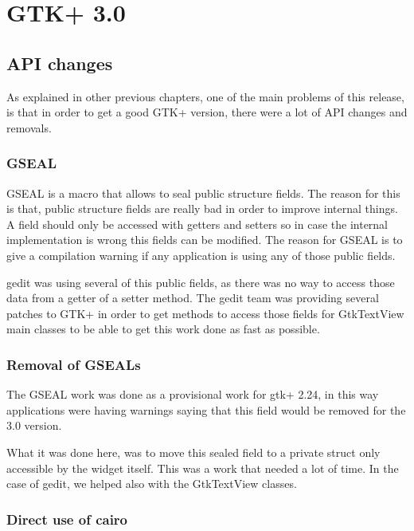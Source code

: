 
\chapter{GTK+ 3.0}


\section{API changes}

As explained in other previous chapters, one of the main problems of this release, is that in order to get a good GTK+ version, there were a lot of API changes and removals.

\subsection{GSEAL}

GSEAL is a macro that allows to seal public structure fields. The reason for this is that, public structure fields are really bad in order to improve internal things. A field should only be accessed with getters and setters so in case the internal implementation is wrong this fields can be modified. The reason for GSEAL is to give a compilation warning if any application is using any of those public fields.

gedit was using several of this public fields, as there was no way to access those data from a getter of a setter method. The gedit team was providing several patches to GTK+ in order to get methods to access those fields for GtkTextView main classes to be able to get this work done as fast as possible.

\subsection{Removal of GSEALs}

The GSEAL work was done as a provisional work for gtk+ 2.24, in this way applications were having warnings saying that this field would be removed for the 3.0 version.

What it was done here, was to move this sealed field to a private struct only accessible by the widget itself. This was a work that needed a lot of time. In the case of gedit, we helped also with the GtkTextView classes.

\subsection{Direct use of cairo}

